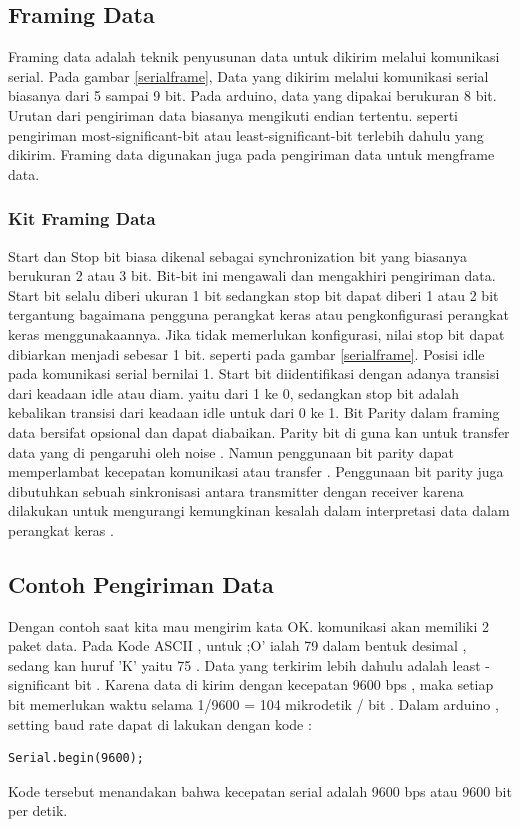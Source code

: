 \subsection{Framing Data}
Framing data adalah teknik penyusunan data untuk dikirim melalui komunikasi serial. Pada gambar \ref{serialframe}, Data yang dikirim melalui komunikasi serial biasanya dari 5 sampai 9 bit. Pada arduino, data yang dipakai berukuran 8 bit. Urutan dari pengiriman data biasanya mengikuti endian tertentu. seperti pengiriman most-significant-bit atau least-significant-bit terlebih dahulu yang dikirim. Framing data digunakan juga pada pengiriman data untuk mengframe data.
\subsubsection{Kit Framing Data}
Start dan Stop bit biasa dikenal sebagai synchronization bit yang biasanya berukuran 2 atau 3 bit. Bit-bit ini mengawali dan mengakhiri pengiriman data. Start bit selalu diberi ukuran 1 bit sedangkan stop bit dapat diberi 1 atau 2 bit tergantung bagaimana pengguna perangkat keras atau pengkonfigurasi perangkat keras menggunakaannya. Jika tidak memerlukan konfigurasi, nilai stop bit dapat dibiarkan menjadi sebesar 1 bit. seperti pada gambar \ref{serialframe}.
Posisi idle pada komunikasi serial bernilai 1. Start bit diidentifikasi dengan adanya transisi dari keadaan idle atau diam. yaitu dari 1 ke 0, sedangkan stop bit adalah kebalikan transisi dari keadaan idle untuk dari 0 ke 1.
Bit Parity dalam framing data bersifat opsional dan dapat diabaikan. Parity bit di guna kan untuk transfer data yang di pengaruhi oleh noise . Namun penggunaan bit parity dapat memperlambat kecepatan komunikasi atau transfer . Penggunaan bit parity juga dibutuhkan sebuah sinkronisasi antara transmitter dengan receiver karena dilakukan untuk mengurangi kemungkinan kesalah dalam interpretasi data dalam perangkat keras .

\subsection{Contoh Pengiriman Data}
Dengan contoh saat kita mau mengirim kata OK. komunikasi akan memiliki 2 paket data. Pada Kode ASCII , untuk ;O' ialah 79 dalam bentuk desimal , sedang kan huruf 'K' yaitu 75 . Data yang terkirim lebih dahulu adalah least - significant bit . Karena data di kirim dengan kecepatan 9600 bps , maka setiap bit memerlukan waktu selama 1/9600 = 104 mikrodetik / bit . Dalam arduino , setting baud rate dapat di lakukan dengan kode :
\begin{verbatim}
Serial.begin(9600);
\end{verbatim}
Kode tersebut menandakan bahwa kecepatan serial adalah 9600 bps atau 9600 bit per detik.

